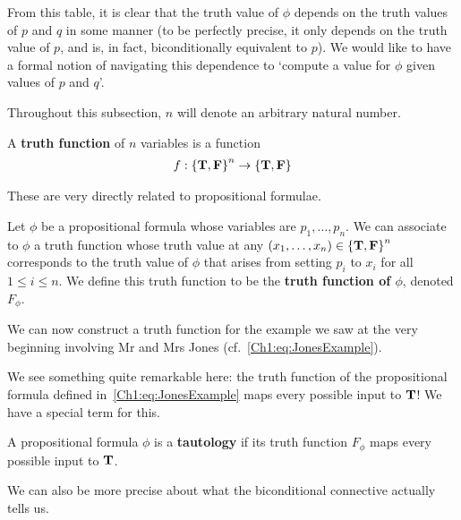 From this table, it is clear that the truth value of $\phi$ depends on the truth values of $p$ and $q$ in some manner (to be perfectly precise, it only depends on the truth value of $p$, and is, in fact, biconditionally equivalent to $p$). We would like to have a formal notion of navigating this dependence to `compute a value for $\phi$ given values of $p$ and $q$'.

Throughout this subsection, $n$ will denote an arbitrary natural number.

\begin{boxdefinition}
    A \textbf{truth function} of $n$ variables is a function
    \begin{align*}
        f : \left\{ \mathbf{T}, \mathbf{F} \right\}^n \to \left\{ \mathbf{T}, \mathbf{F} \right\}
    \end{align*}
\end{boxdefinition}

These are very directly related to propositional formulae.

\begin{boxdefinition}
    Let $\phi$ be a propositional formula whose variables are $p_1, \ldots, p_n$. We can associate to $\phi$ a truth function whose truth value at any $\left( x_1, \ldots, x_n \right) \in \left\{ \mathbf{T}, \mathbf{F} \right\}^n$ corresponds to the truth value of $\phi$ that arises from setting $p_i$ to $x_i$ for all $1 \leq i \leq n$. We define this truth function to be the \textbf{truth function of $\phi$}, denoted $F_{\phi}$.
\end{boxdefinition}

We can now construct a truth function for the example we saw at the very beginning involving Mr and Mrs Jones (cf.~\eqref{Ch1:eq:JonesExample}).

\begin{boxexample}
    \sorry %
\end{boxexample}

We see something quite remarkable here: the truth function of the propositional formula defined in~\eqref{Ch1:eq:JonesExample} maps every possible input to $\mathbf{T}$! We have a special term for this.

\begin{boxdefinition}[Tautology]
    A propositional formula $\phi$ is a \textbf{tautology} if its truth function $F_{\phi}$ maps every possible input to $\mathbf{T}$.
\end{boxdefinition}

We can also be more precise about what the biconditional connective actually tells us.

